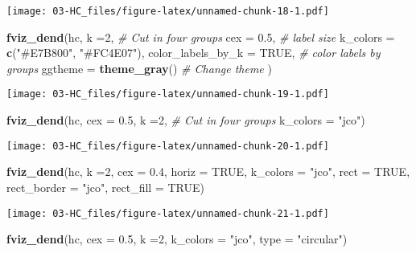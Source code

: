 \documentclass[
]{elegantbook}
\newenvironment{Shaded}{\begin{snugshade}}{\end{snugshade}}
\newcommand{\AttributeTok}[1]{\textcolor[rgb]{0.13,0.29,0.53}{#1}}
\newcommand{\CommentTok}[1]{\textcolor[rgb]{0.56,0.35,0.01}{\textit{#1}}}
\newcommand{\ConstantTok}[1]{\textcolor[rgb]{0.56,0.35,0.01}{#1}}
\newcommand{\DecValTok}[1]{\textcolor[rgb]{0.00,0.00,0.81}{#1}}
\newcommand{\FloatTok}[1]{\textcolor[rgb]{0.00,0.00,0.81}{#1}}
\newcommand{\FunctionTok}[1]{\textcolor[rgb]{0.13,0.29,0.53}{\textbf{#1}}}
\newcommand{\NormalTok}[1]{#1}
\newcommand{\StringTok}[1]{\textcolor[rgb]{0.31,0.60,0.02}{#1}}
\begin{document}
\texttt{[image: 03-HC\_files/figure-latex/unnamed-chunk-18-1.pdf]}

\begin{Shaded}
\begin{Highlighting}[]
\FunctionTok{fviz\_dend}\NormalTok{(hc, }\AttributeTok{k =}\DecValTok{2}\NormalTok{,}
\CommentTok{\# Cut in four groups}
\AttributeTok{cex =} \FloatTok{0.5}\NormalTok{,}
\CommentTok{\# label size}
\AttributeTok{k\_colors =} \FunctionTok{c}\NormalTok{(}\StringTok{"\#E7B800"}\NormalTok{, }\StringTok{"\#FC4E07"}\NormalTok{),}
\AttributeTok{color\_labels\_by\_k =} \ConstantTok{TRUE}\NormalTok{, }\CommentTok{\# color labels by groups}
\AttributeTok{ggtheme =} \FunctionTok{theme\_gray}\NormalTok{()}
\CommentTok{\# Change theme}
\NormalTok{)}
\end{Highlighting}
\end{Shaded}

\texttt{[image: 03-HC\_files/figure-latex/unnamed-chunk-19-1.pdf]}

\begin{Shaded}
\begin{Highlighting}[]
\FunctionTok{fviz\_dend}\NormalTok{(hc, }\AttributeTok{cex =} \FloatTok{0.5}\NormalTok{, }\AttributeTok{k =}\DecValTok{2}\NormalTok{, }\CommentTok{\# Cut in four groups}
\AttributeTok{k\_colors =} \StringTok{"jco"}\NormalTok{)}
\end{Highlighting}
\end{Shaded}

\texttt{[image: 03-HC\_files/figure-latex/unnamed-chunk-20-1.pdf]}

\begin{Shaded}
\begin{Highlighting}[]
\FunctionTok{fviz\_dend}\NormalTok{(hc, }\AttributeTok{k =}\DecValTok{2}\NormalTok{, }\AttributeTok{cex =} \FloatTok{0.4}\NormalTok{, }\AttributeTok{horiz =} \ConstantTok{TRUE}\NormalTok{, }\AttributeTok{k\_colors =} \StringTok{"jco"}\NormalTok{,}
\AttributeTok{rect =} \ConstantTok{TRUE}\NormalTok{, }\AttributeTok{rect\_border =} \StringTok{"jco"}\NormalTok{, }\AttributeTok{rect\_fill =} \ConstantTok{TRUE}\NormalTok{)}
\end{Highlighting}
\end{Shaded}

\texttt{[image: 03-HC\_files/figure-latex/unnamed-chunk-21-1.pdf]}

\begin{Shaded}
\begin{Highlighting}[]
\FunctionTok{fviz\_dend}\NormalTok{(hc, }\AttributeTok{cex =} \FloatTok{0.5}\NormalTok{, }\AttributeTok{k =}\DecValTok{2}\NormalTok{,}
\AttributeTok{k\_colors =} \StringTok{"jco"}\NormalTok{, }\AttributeTok{type =} \StringTok{"circular"}\NormalTok{)}
\end{Highlighting}
\end{Shaded}
\end{document}
